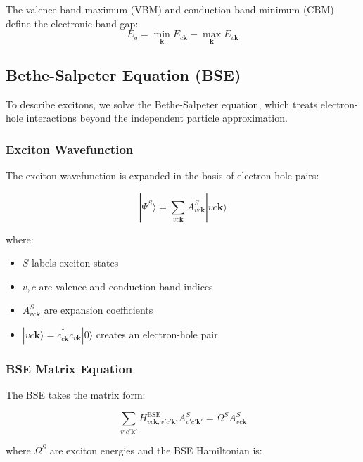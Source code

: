 \documentclass[11pt,a4paper]{article}
\newcommand{\ket}[1]{|#1\rangle}
\begin{document}
The valence band maximum (VBM) and conduction band minimum (CBM) define the electronic band gap:
\begin{equation}
E_g = \min_{\mathbf{k}} E_{c\mathbf{k}} - \max_{\mathbf{k}} E_{v\mathbf{k}}
\end{equation}

\subsection{Bethe-Salpeter Equation (BSE)}

To describe excitons, we solve the Bethe-Salpeter equation, which treats electron-hole interactions beyond the independent particle approximation.

\subsubsection{Exciton Wavefunction}

The exciton wavefunction is expanded in the basis of electron-hole pairs:

\begin{equation}
\ket{\Psi^S} = \sum_{vc\mathbf{k}} A^S_{vc\mathbf{k}} \ket{vc\mathbf{k}}
\end{equation}

where:
\begin{itemize}
    \item $S$ labels exciton states
    \item $v,c$ are valence and conduction band indices
    \item $A^S_{vc\mathbf{k}}$ are expansion coefficients
    \item $\ket{vc\mathbf{k}} = c^\dagger_{c\mathbf{k}} c_{v\mathbf{k}} \ket{0}$ creates an electron-hole pair
\end{itemize}

\subsubsection{BSE Matrix Equation}

The BSE takes the matrix form:

\begin{equation}
\sum_{v'c'\mathbf{k}'} H^{\text{BSE}}_{vc\mathbf{k},v'c'\mathbf{k}'} A^S_{v'c'\mathbf{k}'} = \Omega^S A^S_{vc\mathbf{k}}
\end{equation}

where $\Omega^S$ are exciton energies and the BSE Hamiltonian is:
\end{document}
